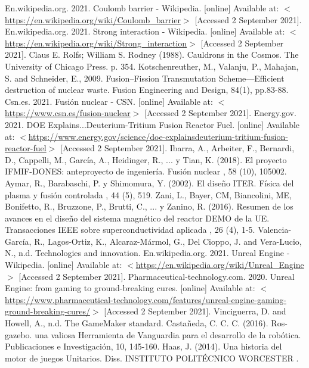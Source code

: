 \begin{thebibliography}{2}
	 En.wikipedia.org. 2021. Coulomb barrier - Wikipedia. [online] Available at: $<$\url{https://en.wikipedia.org/wiki/Coulomb\_barrier}$>$ [Accessed 2 September 2021].
	 En.wikipedia.org. 2021. Strong interaction - Wikipedia. [online] Available at: $<$\url{https://en.wikipedia.org/wiki/Strong\_interaction}$>$ [Accessed 2 September 2021].
	 Claus E. Rolfs; William S. Rodney (1988). Cauldrons in the Cosmos. The University of Chicago Press. p. 354.
	 Kotschenreuther, M., Valanju, P., Mahajan, S. and Schneider, E., 2009. Fusion–Fission Transmutation Scheme—Efficient destruction of nuclear waste. Fusion Engineering and Design, 84(1), pp.83-88.
	 Csn.es. 2021. Fusión nuclear - CSN. [online] Available at: $<$\url{https://www.csn.es/fusion-nuclear}$>$ [Accessed 2 September 2021].
	 Energy.gov. 2021. DOE Explains...Deuterium-Tritium Fusion Reactor Fuel. [online] Available at: $<$\url{https://www.energy.gov/science/doe-explainsdeuterium-tritium-fusion-reactor-fuel}$>$ [Accessed 2 September 2021].
	 Ibarra, A., Arbeiter, F., Bernardi, D., Cappelli, M., García, A., Heidinger, R., ... y Tian, K. (2018). El proyecto IFMIF-DONES: anteproyecto de ingeniería. Fusión nuclear , 58 (10), 105002.
	 Aymar, R., Barabaschi, P. y Shimomura, Y. (2002). El diseño ITER. Física del plasma y fusión controlada , 44 (5), 519.
	 Zani, L., Bayer, CM, Biancolini, ME, Bonifetto, R., Bruzzone, P., Brutti, C., ... y Zanino, R. (2016). Resumen de los avances en el diseño del sistema magnético del reactor DEMO de la UE. Transacciones IEEE sobre superconductividad aplicada , 26 (4), 1-5.
	 Valencia-García, R., Lagos-Ortiz, K., Alcaraz-Mármol, G., Del Cioppo, J. and Vera-Lucio, N., n.d. Technologies and innovation.
	 En.wikipedia.org. 2021. Unreal Engine - Wikipedia. [online] Available at: $<$\url{https://en.wikipedia.org/wiki/Unreal\_Engine}$>$ [Accessed 2 September 2021].
	 Pharmaceutical-technology.com. 2020. Unreal Engine: from gaming to ground-breaking cures. [online] Available at: $<$\url{https://www.pharmaceutical-technology.com/features/unreal-engine-gaming-ground-breaking-cures/}$>$ [Accessed 2 September 2021].
	 Vinciguerra, D. and Howell, A., n.d. The GameMaker standard.
	 Castañeda, C. C. C. (2016). Ros-gazebo. una valiosa Herramienta de Vanguardia para el desarrollo de la robótica. Publicaciones e Investigación, 10, 145-160.
	 Haas, J. (2014). Una historia del motor de juegos Unitarios. Diss. INSTITUTO POLITÉCNICO WORCESTER .

\end{thebibliography}

